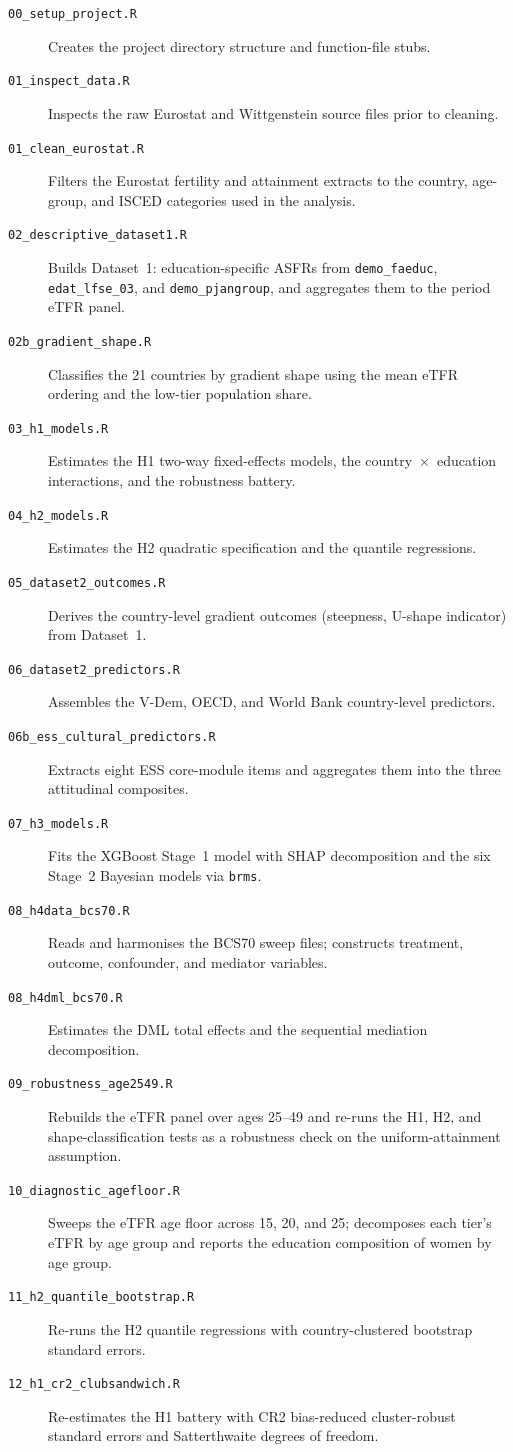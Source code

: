 \documentclass[12pt,a4paper]{report}
\begin{document}
\begin{description}
\item[\texttt{00\_setup\_project.R}] Creates the project directory structure and function-file stubs.
\item[\texttt{01\_inspect\_data.R}] Inspects the raw Eurostat and Wittgenstein source files prior to cleaning.
\item[\texttt{01\_clean\_eurostat.R}] Filters the Eurostat fertility and attainment extracts to the country, age-group, and ISCED categories used in the analysis.
\item[\texttt{02\_descriptive\_dataset1.R}] Builds Dataset~1: education-specific ASFRs from \texttt{demo\_faeduc}, \texttt{edat\_lfse\_03}, and \texttt{demo\_pjangroup}, and aggregates them to the period eTFR panel.
\item[\texttt{02b\_gradient\_shape.R}] Classifies the 21 countries by gradient shape using the mean eTFR ordering and the low-tier population share.
\item[\texttt{03\_h1\_models.R}] Estimates the H1 two-way fixed-effects models, the country~$\times$~education interactions, and the robustness battery.
\item[\texttt{04\_h2\_models.R}] Estimates the H2 quadratic specification and the quantile regressions.
\item[\texttt{05\_dataset2\_outcomes.R}] Derives the country-level gradient outcomes (steepness, U-shape indicator) from Dataset~1.
\item[\texttt{06\_dataset2\_predictors.R}] Assembles the V-Dem, OECD, and World Bank country-level predictors.
\item[\texttt{06b\_ess\_cultural\_predictors.R}] Extracts eight ESS core-module items and aggregates them into the three attitudinal composites.
\item[\texttt{07\_h3\_models.R}] Fits the XGBoost Stage~1 model with SHAP decomposition and the six Stage~2 Bayesian models via \texttt{brms}.
\item[\texttt{08\_h4data\_bcs70.R}] Reads and harmonises the BCS70 sweep files; constructs treatment, outcome, confounder, and mediator variables.
\item[\texttt{08\_h4dml\_bcs70.R}] Estimates the DML total effects and the sequential mediation decomposition.
\item[\texttt{09\_robustness\_age2549.R}] Rebuilds the eTFR panel over ages 25--49 and re-runs the H1, H2, and shape-classification tests as a robustness check on the uniform-attainment assumption.
\item[\texttt{10\_diagnostic\_agefloor.R}] Sweeps the eTFR age floor across 15, 20, and 25; decomposes each tier's eTFR by age group and reports the education composition of women by age group.
\item[\texttt{11\_h2\_quantile\_bootstrap.R}] Re-runs the H2 quantile regressions with country-clustered bootstrap standard errors.
\item[\texttt{12\_h1\_cr2\_clubsandwich.R}] Re-estimates the H1 battery with CR2 bias-reduced cluster-robust standard errors and Satterthwaite degrees of freedom.
\end{description}
\end{document}
